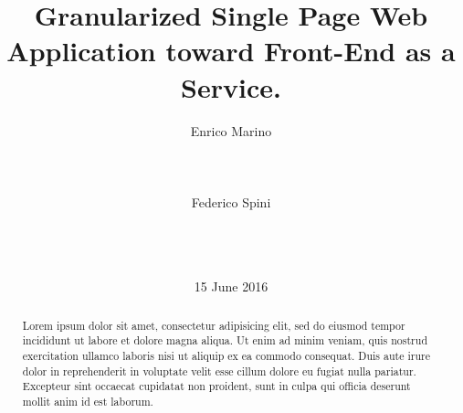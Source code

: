 \documentclass{sig-alternate-05-2015}
\begin{document}






%

\newcommand{\WC}{\textit{Web Component}}
\DeclareRobustCommand{\ttfamily}{\fontencoding{T1}\fontfamily{lmtt}\selectfont}
\DeclareRobustCommand\sectt[1]{{\fontsize{13}{12}\bfseries\ttfamily#1}}


\title{Granularized Single Page Web Application toward Front-End as a Service.}

\author{
\alignauthor Enrico Marino\\
  \\
  \\
  \\
\alignauthor Federico Spini\\
      \\
      \\
      \\
}

\date{15 June 2016}

\maketitle

\begin{abstract}
Lorem ipsum dolor sit amet, consectetur adipisicing elit, sed do eiusmod tempor incididunt ut labore et dolore magna aliqua. Ut enim ad minim veniam, quis nostrud exercitation ullamco laboris nisi ut aliquip ex ea commodo consequat. Duis aute irure dolor in reprehenderit in voluptate velit esse cillum dolore eu fugiat nulla pariatur. Excepteur sint occaecat cupidatat non proident, sunt in culpa qui officia deserunt mollit anim id est laborum.
\end{abstract}
\end{document}
